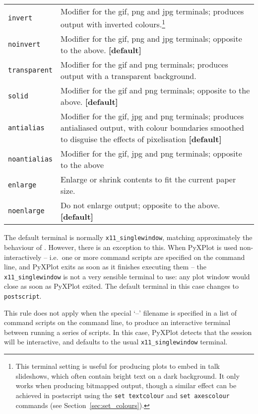 \begin{longtable}{p{3cm}p{9cm}}
{\tt invert} & Modifier for the gif, png and jpg terminals; produces output with inverted colours.\footnote{This terminal setting is useful for producing plots to embed in talk slideshows, which often contain bright text on a dark background. It only works when producing bitmapped output, though a similar effect can be achieved in postscript using the {\tt set textcolour} and {\tt set axescolour} commands (see Section~\ref{sec:set_colours}).}\index{colours!inverting}\\
{\tt noinvert} & Modifier for the gif, png and jpg terminals; opposite to the above. {\bf [default]}\\
{\tt transparent} & Modifier for the gif and png terminals; produces output with a transparent background.\index{transparent terminal}\index{gif output!transparency}\index{png output!transparency}\\
{\tt solid} & Modifier for the gif and png terminals; opposite to the above. {\bf [default]}\\
{\tt antialias} & Modifier for the gif, jpg and png terminals; produces antialiased output, with colour boundaries smoothed to disguise the effects of pixelisation {\bf [default]}\\
{\tt noantialias} & Modifier for the gif, jpg and png terminals; opposite to the
above\\
{\tt enlarge} & Enlarge or shrink contents to fit the current paper
size.\index{enlarging output}\\
{\tt noenlarge} & Do not enlarge output; opposite to the above. {\bf [default]}\\
\end{longtable}

The default terminal is normally {\tt x11\_singlewindow}, matching
approximately the behaviour of \gnuplot. However, there is an exception to this.
When PyXPlot is used non-interactively -- i.e.\ one or more command scripts are
specified on the command line, and PyXPlot exits as soon as it finishes
executing them -- the {\tt x11\_singlewindow} is not a very sensible
terminal to use: any plot window would close as soon as PyXPlot exited. The
default terminal in this case changes to {\tt postscript}.

This rule does not apply when the special `--' filename is specified in a list
of command scripts on the command line, to produce an interactive terminal
between running a series of scripts. In this case, PyXPlot detects that the
session will be interactive, and defaults to the usual
{\tt x11\_singlewindow} terminal.

